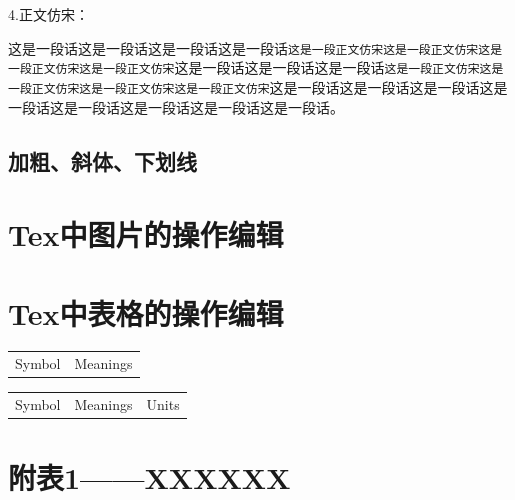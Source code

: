 \documentclass{article}   %
\begin{document}
	\noindent 4.正文仿宋：
		
		这是一段话这是一段话这是一段话这是一段话\texttt{这是一段正文仿宋这是一段正文仿宋这是一段正文仿宋这是一段正文仿宋}这是一段话这是一段话这是一段话\texttt{这是一段正文仿宋这是一段正文仿宋这是一段正文仿宋这是一段正文仿宋}这是一段话这是一段话这是一段话这是一段话这是一段话这是一段话这是一段话这是一段话。
		\subsection{加粗、斜体、下划线}
	\section{Tex中图片的操作编辑}
	
	
	\section{Tex中表格的操作编辑}
		\begin{center}
			\begin{tabular}{cc}
				\hline
				\makebox[0.45\textwidth][c]{符号}	& \makebox[0.45\textwidth][c]{意义}   \\ \hline
				Symbol  & Meanings \\ \hline
			\end{tabular}
		\end{center}
	
		\begin{center}
			\begin{tabular}{ccc}
				\hline
				\makebox[0.25\textwidth][c]{符号}	& \makebox[0.35\textwidth][c]{意义} & \makebox[0.2\textwidth][c]{单位}	 \\ \hline
				Symbol  & Meanings & Units\\ \hline
			\end{tabular}
		\end{center}
\newpage

\appendix 
	\renewcommand{\appendixname}{Appendix~\Alph{section}}
	\section{附表1——XXXXXX}
	
\newpage	
\begin{thebibliography}{9}%
\end{thebibliography}
\end{document}
